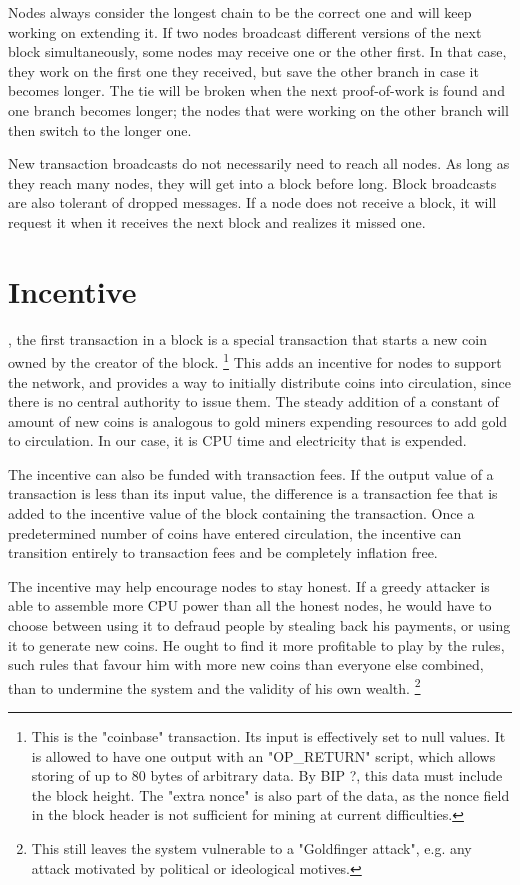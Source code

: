 \documentclass[nohyper]{tufte-handout}
\begin{document}
Nodes always consider the longest chain to be the correct one and will keep working on extending it. If two nodes broadcast different versions of the next block simultaneously, some nodes may receive one or the other first. In that case, they work on the first one they received, but save the other branch in case it becomes longer. The tie will be broken when the next proof-of-work is found and one branch becomes longer; the
nodes that were working on the other branch will then switch to the longer one.

New transaction broadcasts do not necessarily need to reach all nodes.
As long as they reach many nodes, they will get into a block before long. Block broadcasts are also tolerant of dropped messages. If a node does not receive a block, it will request it when it receives the next block and realizes it missed one.

\section{Incentive}\label{incentive}

, the first transaction in a block is a special transaction
that starts a new coin owned by the creator of the block.  \footnote{This is the "coinbase" transaction.  Its input is effectively set to null values.  It is allowed to have one output with an "OP\_RETURN" script, which allows storing of up to 80 bytes of arbitrary data.  By BIP ?, this data must include the block height.  The "extra nonce" is also part of the data, as the nonce field in the block header is not sufficient for mining at current difficulties.} This adds an
incentive for nodes to support the network, and provides a way to
initially distribute coins into circulation, since there is no central
authority to issue them. The steady addition of a constant of amount of
new coins is analogous to gold miners expending resources to add gold to
circulation. In our case, it is CPU time and electricity that is
expended.

The incentive can also be funded with transaction fees. If the output
value of a transaction is less than its input value, the difference is a
transaction fee that is added to the incentive value of the block
containing the transaction. Once a predetermined number of coins have
entered circulation, the incentive can transition entirely to
transaction fees and be completely inflation free.

The incentive may help encourage nodes to stay honest. If a greedy
attacker is able to assemble more CPU power than all the honest nodes,
he would have to choose between using it to defraud people by stealing
back his payments, or using it to generate new coins. He ought to find
it more profitable to play by the rules, such rules that favour him with
more new coins than everyone else combined, than to undermine the system
and the validity of his own wealth.  \footnote[][-1in]{This still leaves the system vulnerable to a "Goldfinger attack", e.g. any attack motivated by political or ideological motives.}
\end{document}

